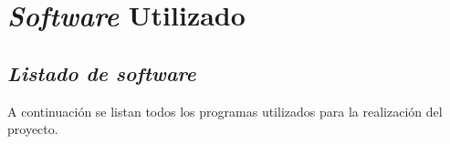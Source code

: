 
\chapter{\textit{Software} Utilizado} %

\label{AppendixC} %

\section{\textit{Listado de \textit{software}}} %
A continuación se listan todos los programas utilizados para la realización del proyecto.

